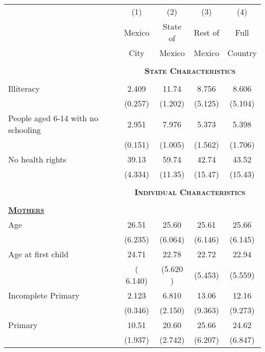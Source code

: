 
 
  	
  	
 
 
 
 
{\small 	\begin{tabular}{lcccc}\toprule\toprule
		& (1) & (2) & (3) & (4) \\ 
  	& Mexico & State of & Rest of & Full \\ 
 	&City&Mexico&Mexico&Country \\ 
	
	
	\hline &&&&\\
		 \multirow{1}{*}{} &
		 \multicolumn{4}{c}{\textbf{\textsc{State Characteristics}} }\\\cline{2-5}
 &&&&\\
	
	Illiteracy      &       2.409&       11.74&       8.756&       8.606\\
	&     (0.257)&     (1.202)&     (5.125)&     (5.104)\\
	
	People aged 6-14 with no schooling   &       2.951&       7.976&       5.373&       5.398\\
	&     (0.151)&     (1.005)&     (1.562)&     (1.706)\\
	
	No health rights    &       39.13&       59.74&       42.74&       43.52\\
	&     (4.334)&     (11.35)&     (15.47)&     (15.43)\\
 

	 &&&&\\
			 \multirow{1}{*}{} &
			 \multicolumn{4}{c}{\textbf{\textsc{Individual Characteristics}} }\\\cline{2-5}
		&&&&\\
 	 
 	\textbf{\textsc{\underline{Mothers}}}	&&&&\\
 	  
 	  Age & 26.51& 25.60&25.61 &25.66\\
 		&(6.235)&(6.064)&(6.146)&(6.145)\\
 	  Age at first child& 24.71& 22.78& 22.72& 22.94  \\
 		&( 6.140)&(5.620 )&(5.453)&(5.559)\\
 		 
 	 
  Incomplete Primary&       2.123&       6.810&       13.06&       12.16\\
	&     (0.346)&     (2.150)&     (9.363)&     (9.273)\\
  Primary&       10.51&       20.60&       25.66&       24.62\\
	&     (1.937)&     (2.742)&     (6.207)&     (6.847)\\
 

\end{tabular}}
